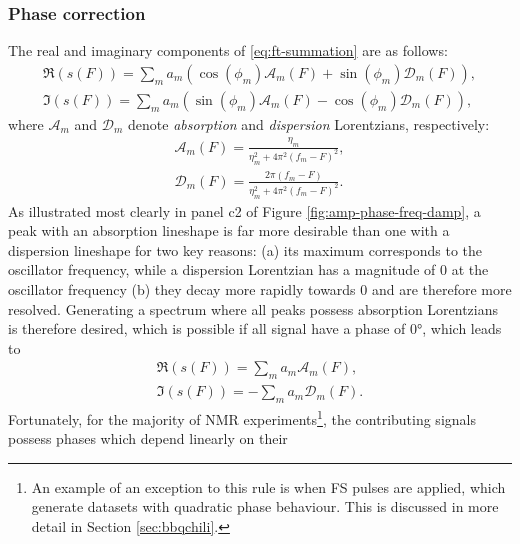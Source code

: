 \subsubsection{Phase correction}
The real and imaginary components of \eqref{eq:ft-summation} are as follows:
\begin{subequations}
    \begin{gather}
        \Re(s(F)) = \sum_m
        a_m (\cos(\phi_m) \mathcal{A}_m(F) + \sin(\phi_m) \mathcal{D}_m(F)),\\
        \Im(s(F)) = \sum_m
        a_m (\sin(\phi_m) \mathcal{A}_m(F) - \cos(\phi_m) \mathcal{D}_m(F)),
    \end{gather}
\end{subequations}
where $\mathcal{A}_m$ and  $\mathcal{D}_m$ denote \emph{absorption} and
\emph{dispersion} Lorentzians, respectively:
\begin{subequations}
    \begin{gather}
        \mathcal{A}_m(F) = \frac{\eta_m}{\eta_m^2 + 4 \pi^2 (f_m - F)^2},\\
        \mathcal{D}_m(F) = \frac{2 \pi (f_m - F)}{\eta_m^2 + 4 \pi^2 (f_m - F)^2}.
    \end{gather}
\end{subequations}
As illustrated most clearly in panel c2 of Figure
\ref{fig:amp-phase-freq-damp}, a peak with an absorption lineshape is far more
desirable than one with a dispersion lineshape for two key
reasons: (a) its maximum corresponds to the oscillator frequency, while a
dispersion Lorentzian has a magnitude of $0$ at the oscillator frequency (b)
they decay more rapidly towards $0$ and are therefore more resolved. Generating
a spectrum where all peaks possess absorption Lorentzians is therefore desired,
which is possible if all signal have a phase of \ang{0}, which leads to
\begin{subequations}
    \begin{gather}
        \Re(s(F)) = \sum_m a_m \mathcal{A}_m(F),\label{eq:absorption}\\
        \Im(s(F)) = -\sum_m a_m \mathcal{D}_m(F).\label{eq:dispersion}
    \end{gather}
\end{subequations}
 Fortunately, for the majority of \ac{NMR} experiments\footnote{
     An example of an exception to this rule is when \acl{FS} pulses are applied,
     which generate datasets with quadratic phase behaviour. This is discussed
     in more detail in Section \ref{sec:bbqchili}.
}, the contributing signals possess phases which depend linearly on their
